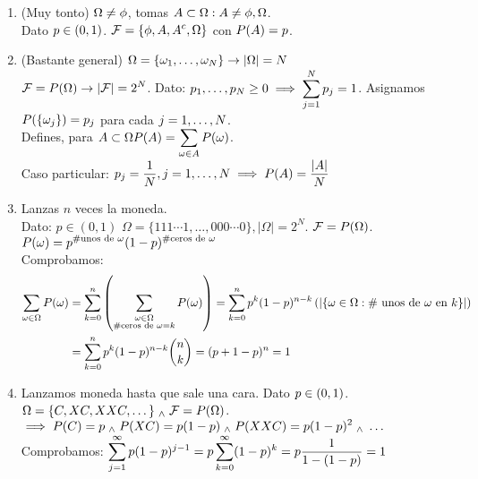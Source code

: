 \begin{enumerate}%
    \item (Muy tonto) $\displaystyle\Omega \ne \phi$, tomas $\displaystyle A \subset \Omega : A\ne \phi, \Omega$. \\
    Dato $\displaystyle p\in (0, 1)$. $\displaystyle\mathcal{F} = \{\phi, A, A^c, \Omega\}$ con $\displaystyle P(A) = p$.
    \item (Bastante general) $\displaystyle\Omega = \{\omega_1, \dots, \omega_N\} \rightarrow |\Omega| = N$ \\
    $\displaystyle\mathcal{F} = P(\Omega) \rightarrow |\mathcal{F}|=2^N$. Dato: $\displaystyle p_1, \dots, p_N \ge 0 \implies \sum_{j=1}^N p_j=1$.
    Asignamos $\displaystyle P(\{\omega_j\})=p_j$ para cada $\displaystyle j=1, \dots, N$.\\
    Defines, para $\displaystyle A\subset \Omega P(A) = \sum_{\omega \in A}P(\omega)$.\\
    Caso particular: $\displaystyle p_j=\frac{1}{N}, j = 1,\dots, N \implies P(A)=\frac{|A|}{N}$
    \item Lanzas $n$ veces la moneda. \\
    Dato: $p \in (0,1)$
    $\Omega = \{111\cdots1, \dots, 000\cdots0\}, |\Omega|=2^N$. $\mathcal{F}=P(\Omega)$. \\
    $\displaystyle P(\omega)= p^{\#\text{unos de }\omega} (1-p)^{\#\text{ceros de }\omega}$ \\
    Comprobamos:
    \begin{equation*}
        \begin{split}
            \displaystyle\sum_{\omega \in \Omega} P(\omega)&=\sum_{k=0}^n \left(\sum_{\substack{\omega\in \Omega \\
            \#\text{ceros de }\omega = k}} P(\omega)\right)=\sum_{k=0}^n p^k (1-p)^{n-k}\left(|\{\omega\in \Omega :\#\text{ unos de } \omega\text{ en }k\}|\right) \\
            &=\sum_{k=0}^np^k(1-p)^{n-k} \binom{n}{k} = (p+1-p)^n=1
        \end{split}
    \end{equation*}
    \item Lanzamos moneda hasta que sale una cara. Dato $\displaystyle p\in (0,1)$. \\
    $\displaystyle \Omega = \{C, XC, XXC, \dots\} \; _{\wedge} \; \mathcal{F}=P(\Omega)$. \\
    $\displaystyle \implies P(C)=p \; _{\wedge} \; P(XC)=p(1-p) \; _{\wedge} \; P(XXC)=p(1-p)^2 \; _{\wedge} \; \dots$ \\
    Comprobamos: $\displaystyle\sum_{j=1}^{\infty} p(1-p)^{j-1} = p\sum_{k=0}^\infty(1-p)^k = p \frac{1}{1-(1-p)} = 1$
\end{enumerate}

